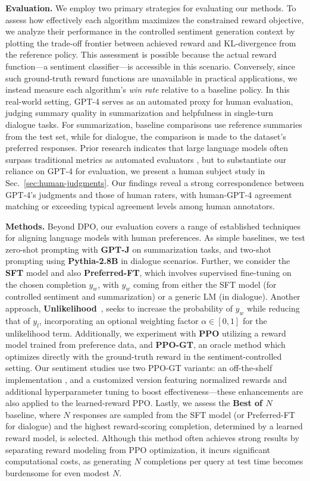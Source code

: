 \textbf{Evaluation.} We employ two primary strategies for evaluating our methods. To assess how effectively each algorithm maximizes the constrained reward objective, we analyze their performance in the controlled sentiment generation context by plotting the trade-off frontier between achieved reward and KL-divergence from the reference policy. This assessment is possible because the actual reward function—a sentiment classifier—is accessible in this scenario. Conversely, since such ground-truth reward functions are unavailable in practical applications, we instead measure each algorithm's \textit{win rate} relative to a baseline policy. In this real-world setting, GPT-4 serves as an automated proxy for human evaluation, judging summary quality in summarization and helpfulness in single-turn dialogue tasks. For summarization, baseline comparisons use reference summaries from the test set, while for dialogue, the comparison is made to the dataset’s preferred responses. Prior research indicates that large language models often surpass traditional metrics as automated evaluators \citep{Chen2023ExploringTU}, but to substantiate our reliance on GPT-4 for evaluation, we present a human subject study in Sec.~\ref{sec:human-judgments}. Our findings reveal a strong correspondence between GPT-4's judgments and those of human raters, with human-GPT-4 agreement matching or exceeding typical agreement levels among human annotators.

\textbf{Methods.} Beyond DPO, our evaluation covers a range of established techniques for aligning language models with human preferences. As simple baselines, we test zero-shot prompting with \textbf{GPT-J} \citep{gpt-j} on summarization tasks, and two-shot prompting using \textbf{Pythia-2.8B} \citep{biderman2023pythia} in dialogue scenarios. Further, we consider the \textbf{SFT} model and also \textbf{Preferred-FT}, which involves supervised fine-tuning on the chosen completion $y_w$, with $y_w$ coming from either the SFT model (for controlled sentiment and summarization) or a generic LM (in dialogue). Another approach, \textbf{Unlikelihood}~\citep{welleck2019neural}, seeks to increase the probability of $y_w$ while reducing that of $y_l$, incorporating an optional weighting factor $\alpha\in[0,1]$ for the unlikelihood term. Additionally, we experiment with \textbf{PPO} \citep{schulman2017proximal} utilizing a reward model trained from preference data, and \textbf{PPO-GT}, an oracle method which optimizes directly with the ground-truth reward in the sentiment-controlled setting. Our sentiment studies use two PPO-GT variants: an off-the-shelf implementation \cite{leandro_von_werra_2023_7790115}, and a customized version featuring normalized rewards and additional hyperparameter tuning to boost effectiveness—these enhancements are also applied to the learned-reward PPO. Lastly, we assess the \textbf{Best of $N$} baseline, where $N$ responses are sampled from the SFT model (or Preferred-FT for dialogue) and the highest reward-scoring completion, determined by a learned reward model, is selected. Although this method often achieves strong results by separating reward modeling from PPO optimization, it incurs significant computational costs, as generating $N$ completions per query at test time becomes burdensome for even modest $N$.

